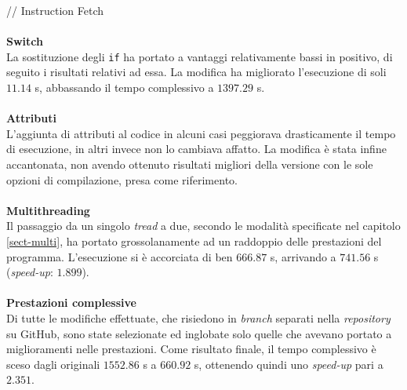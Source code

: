   // Instruction Fetch
\\ \\
\textbf{Switch}\\
  La sostituzione degli \verb|if| ha portato a vantaggi relativamente bassi in 
  positivo, di seguito i risultati relativi ad essa.
  La modifica ha migliorato l'esecuzione di soli $11.14$ s, abbassando il tempo 
  complessivo a $1397.29$ s.
\\ \\
\textbf{Attributi}\\
  L'aggiunta di attributi al codice in alcuni casi peggiorava drasticamente il 
  tempo di esecuzione, in altri invece non lo cambiava affatto. La modifica è 
  stata infine accantonata, non avendo ottenuto risultati migliori della 
  versione con le sole opzioni di compilazione, presa come riferimento.
\\ \\
\textbf{Multithreading}\\
  Il passaggio da un singolo \emph{tread} a due, secondo le modalità 
  specificate nel capitolo \ref{sect-multi}, ha portato grossolanamente ad un 
  raddoppio 
  delle prestazioni del programma.
  L'esecuzione si è accorciata di ben $666.87$ s, arrivando a $741.56$ s 
  (\textit{speed-up}: $1.899$).
\\ \\
\textbf{Prestazioni complessive}\\
  Di tutte le modifiche effettuate, che risiedono in \textit{branch} separati 
  nella \textit{repository} su GitHub, sono state selezionate ed inglobate solo 
  quelle che avevano portato a miglioramenti nelle prestazioni.
  Come risultato finale, il tempo complessivo è sceso dagli originali $1552.86$ 
  s a $660.92$ s, ottenendo quindi uno \textit{speed-up} pari a $2.351$.
    

